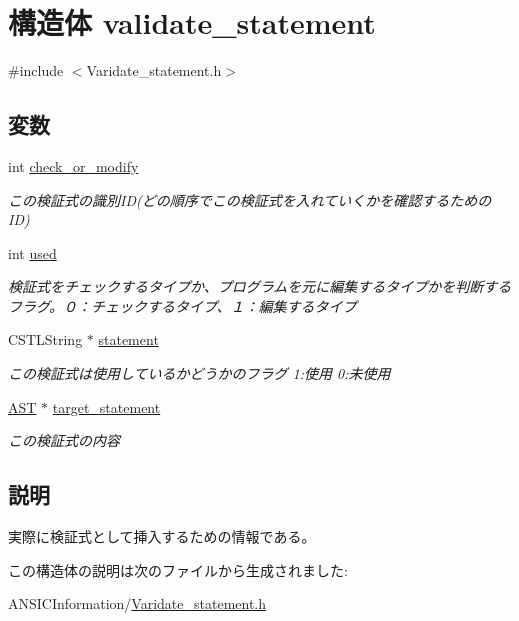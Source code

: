 \section{構造体 validate\_\-statement}
\label{structvalidate__statement}


{\ttfamily \#include $<$Varidate\_\-statement.h$>$}

\subsection*{変数}
\begin{DoxyCompactItemize}
\item 
int \hyperlink{structvalidate__statement_af811a34ac79801a37cfa0c5ce2f92d48}{check\_\-or\_\-modify}\label{structvalidate__statement_af811a34ac79801a37cfa0c5ce2f92d48}

\begin{DoxyCompactList}\small\item\em この検証式の識別ID(どの順序でこの検証式を入れていくかを確認するためのID) \item\end{DoxyCompactList}\item 
int \hyperlink{structvalidate__statement_ad707b113b11d4a04d6950ec7581e52f2}{used}\label{structvalidate__statement_ad707b113b11d4a04d6950ec7581e52f2}

\begin{DoxyCompactList}\small\item\em 検証式をチェックするタイプか、プログラムを元に編集するタイプかを判断するフラグ。０：チェックするタイプ、１：編集するタイプ \item\end{DoxyCompactList}\item 
CSTLString $\ast$ \hyperlink{structvalidate__statement_a2c7d107cd83b73d65b9c6b7919b5f48e}{statement}\label{structvalidate__statement_a2c7d107cd83b73d65b9c6b7919b5f48e}

\begin{DoxyCompactList}\small\item\em この検証式は使用しているかどうかのフラグ 1:使用 0:未使用 \item\end{DoxyCompactList}\item 
\hyperlink{structabstract__syntax__tree}{AST} $\ast$ \hyperlink{structvalidate__statement_a97f962c68638a36d8d3ef5d52f017f84}{target\_\-statement}\label{structvalidate__statement_a97f962c68638a36d8d3ef5d52f017f84}

\begin{DoxyCompactList}\small\item\em この検証式の内容 \item\end{DoxyCompactList}\end{DoxyCompactItemize}


\subsection{説明}
実際に検証式として挿入するための情報である。 

この構造体の説明は次のファイルから生成されました:\begin{DoxyCompactItemize}
\item 
ANSICInformation/\hyperlink{Varidate__statement_8h}{Varidate\_\-statement.h}\end{DoxyCompactItemize}
